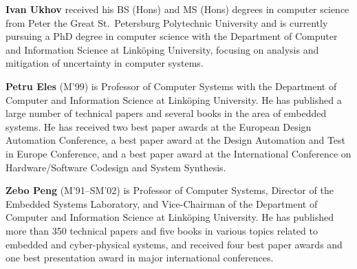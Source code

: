 \begin{footnotesize}
{\bf Ivan Ukhov} received his BS (Hons) and MS (Hons) degrees in computer
science from Peter the Great St.~Petersburg Polytechnic University and is
currently pursuing a PhD degree in computer science with the Department of
Computer and Information Science at Link\"{o}ping University, focusing on
analysis and mitigation of uncertainty in computer systems.

{\bf Petru Eles} (M'99) is Professor of Computer Systems with the Department of
Computer and Information Science at Link\"{o}ping University. He has published a
large number of technical papers and several books in the area of embedded
systems. He has received two best paper awards at the European Design Automation
Conference, a best paper award at the Design Automation and Test in Europe
Conference, and a best paper award at the International Conference on
Hardware/Software Codesign and System Synthesis.

{\bf Zebo Peng} (M'91--SM'02) is Professor of Computer Systems, Director of the
Embedded Systems Laboratory, and Vice-Chairman of the Department of Computer and
Information Science at Link\"{o}ping University. He has published more than 350
technical papers and five books in various topics related to embedded and
cyber-physical systems, and received four best paper awards and one best
presentation award in major international conferences.

\end{footnotesize}
